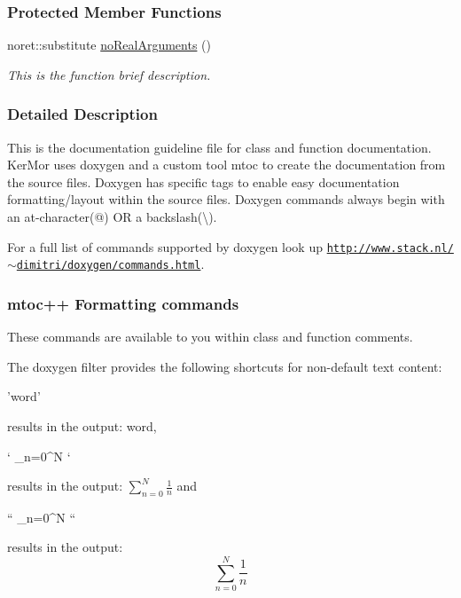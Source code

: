 \subsubsection*{Protected Member Functions}
\begin{DoxyCompactItemize}
\item 
noret\+::substitute \hyperlink{classexamples_1_1_class_aebd897ed5a726cf0f09c5f40a9702484}{no\+Real\+Arguments} ()
\begin{DoxyCompactList}\small\item\em This is the function brief description. \end{DoxyCompactList}\end{DoxyCompactItemize}


\subsubsection{Detailed Description}
This is the documentation guideline file for class and function documentation. Ker\+Mor uses {\ttfamily doxygen} and a custom tool {\ttfamily mtoc} to create the documentation from the source files. Doxygen has specific tags to enable easy documentation formatting/layout within the source files. Doxygen commands always begin with an at-\/character(@) O\+R a backslash(\textbackslash{}).

For a full list of commands supported by doxygen look up \href{http://www.stack.nl/~dimitri/doxygen/commands.html}{\tt http\+://www.\+stack.\+nl/$\sim$dimitri/doxygen/commands.\+html}.\hypertarget{classexamples_1_1_class_dg_formatting}{}\subsubsection{mtoc++ Formatting commands}\label{classexamples_1_1_class_dg_formatting}
These commands are available to you within class and function comments.

The doxygen filter provides the following shortcuts for non-\/default text content\+:
\begin{DoxyItemize}
\item \begin{DoxyVerb}'word' \end{DoxyVerb}
 results in the output\+: {\ttfamily word},
\item \begin{DoxyVerb}` \sum_{n=0}^N  ` \end{DoxyVerb}
 results in the output\+: $ \sum_{n=0}^N \frac{1}{n} $ and
\item \begin{DoxyVerb}`` \sum_{n=0}^N  `` \end{DoxyVerb}
 results in the output\+: \[ \sum_{n=0}^N \frac{1}{n} \]
\end{DoxyItemize}

